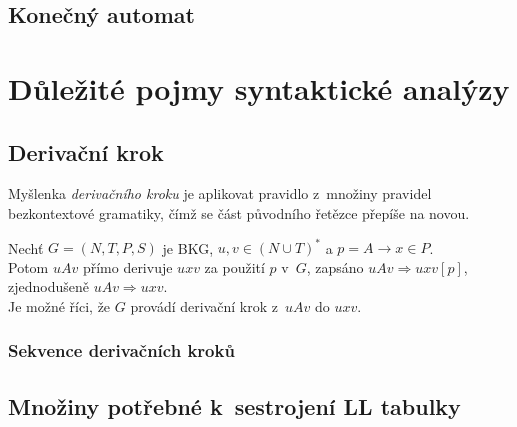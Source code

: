 \section{Konečný automat}
\begin{definition}\label{def_konecny_automat}
    
\end{definition}

\section{}



\chapter{Důležité pojmy syntaktické analýzy }\label{5_teorie_sa}

\section{Derivační krok}
Myšlenka \emph{derivačního kroku} je aplikovat pravidlo z~množiny pravidel bezkontextové gramatiky, čímž se část původního řetězce přepíše na novou.
\begin{definition}
    Nechť $G = (N, T, P, S)$ je BKG, $u, v \in (N \cup T)^*$ a $p = A \rightarrow x \in P$. \\
    Potom $uAv$ přímo derivuje $uxv$ za použití $p$ v~$G$, zapsáno $uAv \Rightarrow uxv [p]$, zjednodušeně $uAv \Rightarrow uxv$.\\
    Je možné říci, že $G$ provádí derivační krok z~$uAv$ do $uxv$.
\end{definition}

\subsection*{Sekvence derivačních kroků}

\section{Množiny potřebné k~sestrojení LL tabulky}

